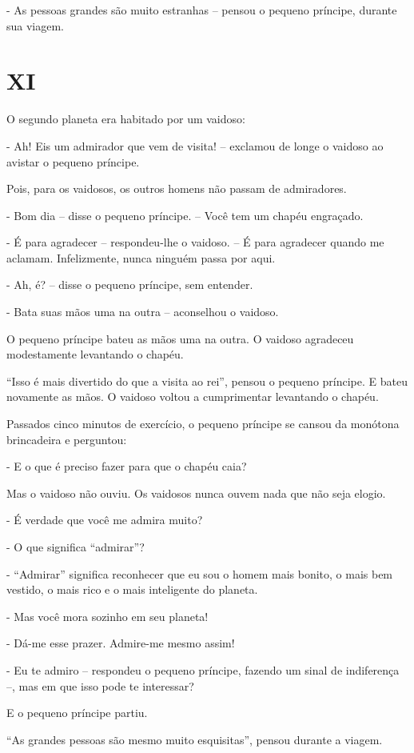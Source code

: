 - As pessoas grandes são muito estranhas -- pensou o pequeno príncipe,
durante sua viagem.

\chapter{XI}

O segundo planeta era habitado por um vaidoso:

- Ah! Eis um admirador que vem de visita! -- exclamou de longe o vaidoso
ao avistar o pequeno príncipe.

Pois, para os vaidosos, os outros homens não passam de admiradores.

- Bom dia -- disse o pequeno príncipe. -- Você tem um chapéu engraçado.

- É para agradecer -- respondeu-lhe o vaidoso. -- É para agradecer
quando me aclamam. Infelizmente, nunca ninguém passa por aqui.

- Ah, é? -- disse o pequeno príncipe, sem entender.

- Bata suas mãos uma na outra -- aconselhou o vaidoso.

O pequeno príncipe bateu as mãos uma na outra. O vaidoso agradeceu
modestamente levantando o chapéu.

``Isso é mais divertido do que a visita ao rei'', pensou o pequeno
príncipe. E bateu novamente as mãos. O vaidoso voltou a cumprimentar
levantando o chapéu.

Passados cinco minutos de exercício, o pequeno príncipe se cansou da
monótona brincadeira e perguntou:

- E o que é preciso fazer para que o chapéu caia?

Mas o vaidoso não ouviu. Os vaidosos nunca ouvem nada que não seja
elogio.

- É verdade que você me admira muito?

- O que significa ``admirar''?

- ``Admirar'' significa reconhecer que eu sou o homem mais bonito, o
mais bem vestido, o mais rico e o mais inteligente do planeta.

- Mas você mora sozinho em seu planeta!

- Dá-me esse prazer. Admire-me mesmo assim!

- Eu te admiro -- respondeu o pequeno príncipe, fazendo um sinal de
indiferença --, mas em que isso pode te interessar?

E o pequeno príncipe partiu.

``As grandes pessoas são mesmo muito esquisitas'', pensou durante a
viagem.

